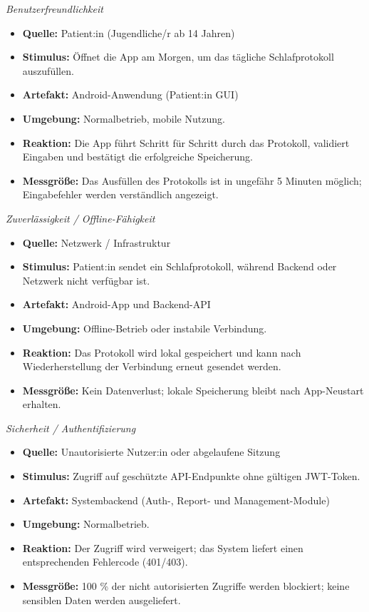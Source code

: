 \textit{Benutzerfreundlichkeit}
\begin{itemize}
  \item[] \textbf{Quelle:} Patient:in (Jugendliche/r ab 14 Jahren)
  \item[] \textbf{Stimulus:} Öffnet die App am Morgen, um das tägliche Schlafprotokoll auszufüllen.
  \item[] \textbf{Artefakt:} Android-Anwendung (Patient:in GUI)
  \item[] \textbf{Umgebung:} Normalbetrieb, mobile Nutzung.
  \item[] \textbf{Reaktion:} Die App führt Schritt für Schritt durch das Protokoll, validiert Eingaben und bestätigt die erfolgreiche Speicherung.
  \item[] \textbf{Messgröße:} Das Ausfüllen des Protokolls ist in ungefähr 5 Minuten möglich; Eingabefehler werden verständlich angezeigt.
\end{itemize}

\textit{Zuverlässigkeit / Offline-Fähigkeit}
\begin{itemize}
  \item[] \textbf{Quelle:} Netzwerk / Infrastruktur
  \item[] \textbf{Stimulus:} Patient:in sendet ein Schlafprotokoll, während Backend oder Netzwerk nicht verfügbar ist.
  \item[] \textbf{Artefakt:} Android-App und Backend-API
  \item[] \textbf{Umgebung:} Offline-Betrieb oder instabile Verbindung.
  \item[] \textbf{Reaktion:} Das Protokoll wird lokal gespeichert und kann nach Wiederherstellung der Verbindung erneut gesendet werden.
  \item[] \textbf{Messgröße:} Kein Datenverlust; lokale Speicherung bleibt nach App-Neustart erhalten.
\end{itemize}

\textit{Sicherheit / Authentifizierung}
\begin{itemize}
  \item[] \textbf{Quelle:} Unautorisierte Nutzer:in oder abgelaufene Sitzung
  \item[] \textbf{Stimulus:} Zugriff auf geschützte API-Endpunkte ohne gültigen JWT-Token.
  \item[] \textbf{Artefakt:} Systembackend (Auth-, Report- und Management-Module)
  \item[] \textbf{Umgebung:} Normalbetrieb.
  \item[] \textbf{Reaktion:} Der Zugriff wird verweigert; das System liefert einen entsprechenden Fehlercode (401/403).
  \item[] \textbf{Messgröße:} 100 \% der nicht autorisierten Zugriffe werden blockiert; keine sensiblen Daten werden ausgeliefert.
\end{itemize}

